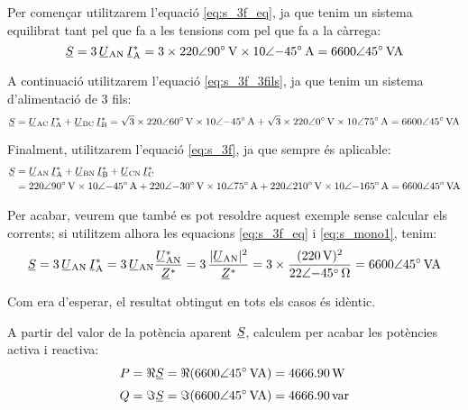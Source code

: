 \begin{exemple}[\PotSistTresFils{}]
    Per començar  utilitzarem l'equació \eqref{eq:s_3f_eq}, ja que tenim
    un sistema equilibrat tant pel que fa a les tensions com pel que fa a la càrrega:
    \[
    \cmplx{S} = 3\,\cmplx{U}\ped{AN} \,\cmplx{I}\ped{A}^* =
    3\times \complexqty{220:90}{V} \times
    \complexqty{10:-45}{A} = \complexqty{6600:45}{VA}
    \]

    A continuació  utilitzarem l'equació \eqref{eq:s_3f_3fils}, ja que tenim
    un sistema d'alimentació de 3 fils:
    \[
    \cmplx{S} = \cmplx{U}\ped{AC} \,\cmplx{I}\ped{A}^*
     +  \cmplx{U}\ped{BC} \,\cmplx{I}\ped{B}^* =
    \sqrt{3}\times \complexqty{220:60}{V} \times
    \complexqty{10:-45}{A} + \sqrt{3}\times \complexqty{220:0}{V}
    \times \complexqty{10:75}{A}  = \complexqty{6600:45}{VA}
    \]

     Finalment,  utilitzarem l'equació \eqref{eq:s_3f}, ja que
     sempre és aplicable:
     \[\begin{split}
     \cmplx{S} &=  \cmplx{U}\ped{AN} \,\cmplx{I}\ped{A}^* +
     \cmplx{U}\ped{BN} \,\cmplx{I}\ped{B}^* +  \cmplx{U}\ped{CN}\,
     \cmplx{I}\ped{C}^* \\
     &= \complexqty{220:90}{V}
     \times \complexqty{10:-45}{A} + \complexqty{220:-30}{V} \times \complexqty{10:75}{A}
     + \complexqty{220:210}{V} \times \complexqty{10:-165}{A} = \complexqty{6600:45}{VA}
     \end{split} \]

    Per acabar, veurem que també es pot resoldre aquest exemple
    sense calcular els corrents; si utilitzem alhora les
    equacions \eqref{eq:s_3f_eq} i \eqref{eq:s_mono1}, tenim:
    \[
    \cmplx{S} = 3\,\cmplx{U}\ped{AN} \,\cmplx{I}\ped{A}^* =
    3\,\cmplx{U}\ped{AN}\frac{\cmplx{U}\ped{AN}^*}{\cmplx{Z}^*} =
    3\, \frac{|\cmplx{U}\ped{AN}|^2}{\cmplx{Z}^*} =
    3 \times \frac{(\qty{220}{V})^2}{\complexqty{22:-45}{\ohm}} =
    \complexqty{6600:45}{VA}
    \]

    Com era d'esperar, el resultat obtingut en tots els casos
    és idèntic.

    A partir del valor de la potència aparent $\cmplx{S}$, calculem per acabar les potències activa i reactiva:
    \begin{align*}
        P &= \Re\cmplx{S} = \Re(\complexqty{6600:45}{VA}) = \qty{4666,90}{W}\\[1mm]
        Q &= \Im\cmplx{S} = \Im(\complexqty{6600:45}{VA}) = \qty{4666,90}{var}
    \end{align*}

\end{exemple}

